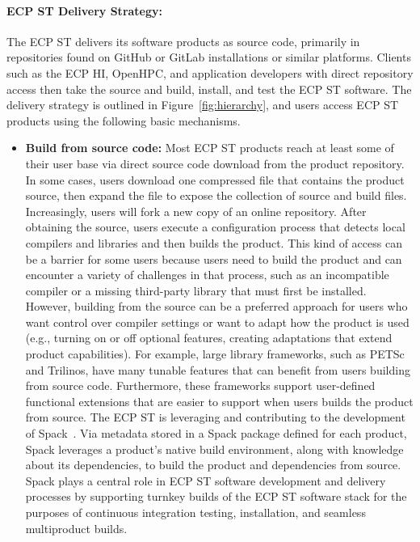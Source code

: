 \paragraph{ECP ST Delivery Strategy:}
The ECP ST delivers its software products as source code, primarily in repositories found on GitHub or GitLab installations or similar platforms. Clients such as the ECP HI, OpenHPC, and application developers with direct repository access then take the source and build, install, and test the ECP ST software. The delivery strategy is outlined in Figure~\ref{fig:hierarchy}, and  
%
users access ECP ST products using the following basic mechanisms.
\begin{itemize}
	\item \textbf{Build from source code:} Most ECP ST products reach at least some of their user base via direct source code download from the product repository.  In some cases, users download one compressed file that contains the product source, then expand the file to expose the collection of source and build files.  Increasingly, users will fork a new copy of an online repository.  After obtaining the source, users execute a configuration process that detects local compilers and libraries and then builds the product.  This kind of access can be a barrier for some users because users need to build the product and can encounter a variety of challenges in that process, such as an incompatible compiler or a missing third-party library that must first be installed.  However, building from the source can be a preferred approach for users who want control over compiler settings or want to adapt how the product is used (e.g., turning on or off optional features, creating adaptations that extend product capabilities). For example, large library frameworks, such as PETSc and Trilinos, have many tunable features that can benefit from users building from source code.  Furthermore, these frameworks support user-defined functional extensions that are easier to support when users builds the product from source. The ECP ST is leveraging and contributing to the development of Spack~\cite{gamblin+:sc15}.  Via metadata stored in a Spack package defined for each product, Spack leverages a product's native build environment, along with knowledge about its dependencies, to build the product and dependencies from source.  Spack plays a central role in ECP ST software development and delivery processes by supporting turnkey builds of the ECP ST software stack for the purposes of continuous integration testing, installation, and seamless multiproduct builds.

\end{itemize}

